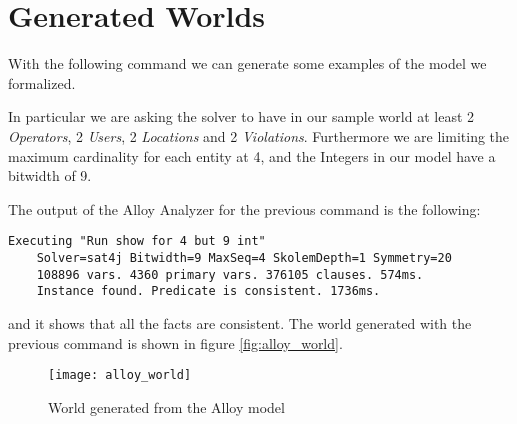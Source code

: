 \section{Generated Worlds}
With the following command we can generate some examples of the model we 
formalized.

In particular we are asking the solver to have in our sample world at least 2
\emph{Operators}, 2 \emph{Users}, 2 \emph{Locations} and 2 \emph{Violations}.
Furthermore we are limiting the maximum cardinality for each entity at 4, and
the Integers in our model have a bitwidth of 9.

The output of the Alloy Analyzer for the previous command is the following:
\begin{lstlisting}
Executing "Run show for 4 but 9 int"
    Solver=sat4j Bitwidth=9 MaxSeq=4 SkolemDepth=1 Symmetry=20
    108896 vars. 4360 primary vars. 376105 clauses. 574ms.
    Instance found. Predicate is consistent. 1736ms.
\end{lstlisting}
and it shows that all the facts are consistent. The world generated with the
previous command is shown in figure \vref{fig:alloy_world}.

\begin{figure}[hb]
    \centering
    \texttt{[image: alloy\_world]}
    \caption{World generated from the Alloy model}
    \label{fig:alloy_world}
\end{figure}
